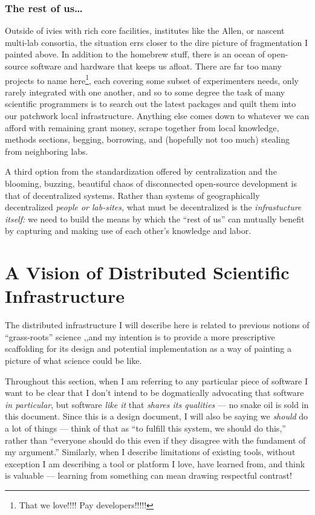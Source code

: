 \documentclass{article}
\begin{document}
\hypertarget{the-rest-of-us}{%
\subsubsection{The rest of us\ldots{}}\label{the-rest-of-us}}

Outside of ivies with rich core facilities, institutes like the Allen,
or nascent multi-lab consortia, the situation errs closer to the dire
picture of fragmentation I painted above. In addition to the homebrew
stuff, there is an ocean of open-source software and hardware that keeps
us afloat. There are far too many projects to name here\footnote{That we
  love!!!! Pay developers!!!!!}, each covering some subset of
experimenters needs, only rarely integrated with one another, and so to
some degree the task of many scientific programmers is to search out the
latest packages and quilt them into our patchwork local infrastructure.
Anything else comes down to whatever we can afford with remaining grant
money, scrape together from local knowledge, methods sections, begging,
borrowing, and (hopefully not too much) stealing from neighboring labs.

A third option from the standardization offered by centralization and
the blooming, buzzing, beautiful chaos of disconnected open-source
development is that of decentralized systems. Rather than systems of
geographically decentralized \emph{people or lab-sites,} what must be
decentralized is the \emph{infrastucture itself:} we need to build the
means by which the ``rest of us'' can mutually benefit by capturing and
making use of each other's knowledge and labor.

\hypertarget{a-vision-of-distributed-scientific-infrastructure}{%
\section{A Vision of Distributed Scientific
Infrastructure}\label{a-vision-of-distributed-scientific-infrastructure}}

The distributed infrastructure I will describe here is related to
previous notions of ``grass-roots'' science \cite{mainenBetterWayCrack2016},,and my intention is to provide a more
prescriptive scaffolding for its design and potential implementation as
a way of painting a picture of what science could be like.

Throughout this section, when I am referring to any particular piece of
software I want to be clear that I don't intend to be dogmatically
advocating that software \emph{in particular}, but software \emph{like
it} that \emph{shares its qualities} --- no snake oil is sold in this
document. Since this is a design document, I will also be saying we
\emph{should} do a lot of things --- think of that as ``to fulfill this
system, we should do this,'' rather than ``everyone should do this even
if they disagree with the fundament of my argument.'' Similarly, when I
describe limitations of existing tools, without exception I am
describing a tool or platform I love, have learned from, and think is
valuable --- learning from something can mean drawing respectful
contrast!
\end{document}
